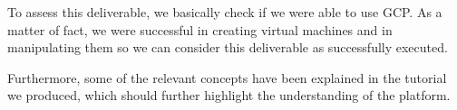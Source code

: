 To assess this deliverable, we basically check if we were able to use
GCP. As a matter of fact, we were successful in creating virtual
machines and in manipulating them so we can consider this deliverable
as successfully executed.

Furthermore, some of the relevant concepts have been explained in the
tutorial we produced, which should further highlight the understanding
of the platform.
